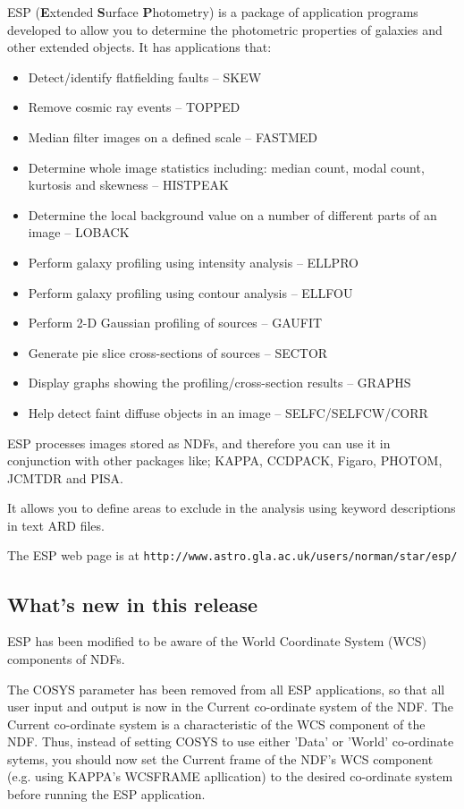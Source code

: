 \documentclass[twoside,11pt]{article}
\newcommand{\htmladdnormallink}[2]{#1}
\newcommand{\xref}[3]{#1}
\newcommand{\xlabel}[1]{}
\begin{document}
ESP ({\bf E}xtended {\bf S}urface {\bf P}hotometry) is a package 
of application programs developed to allow you to determine the photometric 
properties of galaxies and other extended objects. It has applications that:
\begin{itemize}
\item Detect/identify flatfielding faults -- SKEW
\item Remove cosmic ray events -- TOPPED
\item Median filter images on a defined scale -- FASTMED
\item Determine whole image statistics including: median count, modal count,
kurtosis and skewness -- HISTPEAK
\item Determine the local background value on a number of different parts
of an image -- LOBACK
\item Perform galaxy profiling using intensity analysis -- ELLPRO
\item Perform galaxy profiling using contour analysis -- ELLFOU
\item Perform 2-D Gaussian profiling of sources -- GAUFIT
\item Generate pie slice cross-sections of sources -- SECTOR
\item Display graphs showing the profiling/cross-section results -- GRAPHS
\item Help detect faint diffuse objects in an image -- SELFC/SELFCW/CORR
\end{itemize}

ESP processes images stored as NDFs, and therefore you can use it in
conjunction with other packages like; 
\xref{KAPPA}{sun95}{},
\xref{CCDPACK}{sun139}{},
\xref{Figaro}{sun86}{},
\xref{PHOTOM}{sun45}{},
\xref{JCMTDR}{sun132}{}
 and
\xref{PISA}{sun109}{}. 

It allows you to define areas to exclude in the analysis
using keyword descriptions in text ARD files.

The ESP web page is at
\htmladdnormallink{\texttt{http://www.astro.gla.ac.uk/users/norman/star/esp/}}{http://www.astro.gla.ac.uk/users/norman/star/esp/}

\subsection{What's new in this release}
\xlabel{WHATSNEW}

ESP has been modified to be aware of the World Coordinate 
System (WCS) components of NDFs.

The COSYS parameter has been removed from all ESP applications, 
so that all user input and output is now in the Current 
co-ordinate system of the NDF.  The Current co-ordinate system 
is a characteristic of the WCS component of the NDF.  
Thus, instead of setting COSYS to use either 'Data' or 'World'
co-ordinate sytems, you should now set the Current frame of the 
NDF's WCS component (e.g. using KAPPA's WCSFRAME apllication) 
to the desired co-ordinate system before running the ESP 
application.
\end{document}
